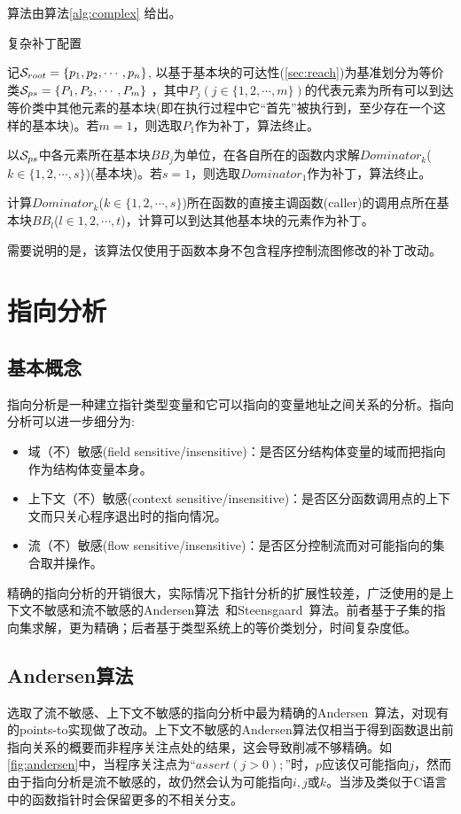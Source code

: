 算法由算法\autoref{alg:complex} 给出。
\begin{algorithm}\label{alg:complex}
  \caption{复杂补丁配置}
  \SetAlgoNoLine
  记$\mathcal{S}_{root} = \{p_1, p_2, \cdots , p_n\}$, 以基于基本块的可达性(\autoref{sec:reach})为基准划分为等价类$\mathcal{S} _{ps}=\{P_1, P_2, \cdots , P_m\}$ ，其中$P_j(j\in\{1, 2, \cdots , m\})$的代表元素为所有可以到达等价类中其他元素的基本块(即在执行过程中它“首先”被执行到，至少存在一个这样的基本块)。若$m=1$，则选取$P_1$作为补丁，算法终止。

以$\mathcal{S}_{ps}$中各元素所在基本块$BB_j$为单位，在各自所在的函数内求解$Dominator_k$($k\in\{1, 2, \cdots , s\}$)(基本块)。若$s=1$，则选取$Dominator_1$作为补丁，算法终止。

计算$Dominator_k$($k\in\{1, 2, \cdots , s\}$)所在函数的直接主调函数(caller)的调用点所在基本块$BB_l$($l\in{1, 2, \cdots , t}$)，计算可以到达其他基本块的元素作为补丁。
\end{algorithm}

需要说明的是，该算法仅使用于函数本身不包含程序控制流图修改的补丁改动。

\section{指向分析}
\label{sec:andersen}

\subsection{基本概念}
\label{subsec:pt_basic}

指向分析是一种建立指针类型变量和它可以指向的变量地址之间关系的分析。指向分析可以进一步细分为:
\begin{itemize}
\item 域（不）敏感(field sensitive/insensitive)：是否区分结构体变量的域而把指向作为结构体变量本身。
\item 上下文（不）敏感(context sensitive/insensitive)：是否区分函数调用点的上下文而只关心程序退出时的指向情况。
\item 流（不）敏感(flow sensitive/insensitive)：是否区分控制流而对可能指向的集合取并操作。
\end{itemize}
精确的指向分析的开销很大，实际情况下指针分析的扩展性较差，广泛使用的是上下文不敏感和流不敏感的Andersen算法~和Steensgaard~算法。前者基于子集的指向集求解，更为精确；后者基于类型系统上的等价类划分，时间复杂度低。

\subsection{Andersen算法}
\label{subsec:andersen}
选取了流不敏感、上下文不敏感的指向分析中最为精确的Andersen~算法，对现有的points-to实现做了改动。上下文不敏感的Andersen算法仅相当于得到函数退出前指向关系的概要而非程序关注点处的结果，这会导致削减不够精确。如\autoref{fig:andersen}中，当程序关注点为“$assert(j > 0);$”时，$p$应该仅可能指向$j$，然而由于指向分析是流不敏感的，故仍然会认为可能指向$i, j$或$k$。当涉及类似于C语言中的函数指针时会保留更多的不相关分支。

